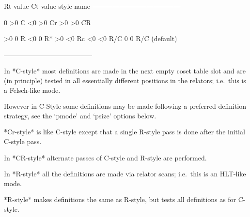 \begintt
Rt value     Ct value     style name
---------------------------------------

   0           >0         C
  <0           >0         Cr
  >0           >0         CR

  >0            0         R
  <0            0         R*
  >0           <0         Rc
  <0           <0         R/C
   0            0         R/C (default)

---------------------------------------
\endtt

In *C-style*  most definitions are made in the  next empty coset table
slot  and  are (in  principle)  tested  in  all essentially  different
positions in the relators; i.e.~this is a Felsch-like mode.

However in C-Style some  definitions may be made following a preferred
definition strategy, see the `pmode' and `psize' options below.

*Cr-style* is like  C-style except that a single R-style  pass is done
after the initial C-style pass.

In *CR-style* alternate passes of C-style and R-style are performed.

In *R-style*  all   the  definitions  are   made  via  relator  scans; 
i.e.~this is an HLT-like mode.

*R\*-style*  makes  definitions the  same as  R-style,  but  tests all
definitions as for C-style.

